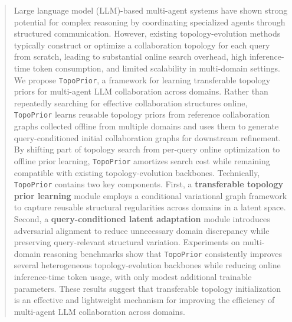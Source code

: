 \documentclass[lettersize,journal]{IEEEtran}
\theoremstyle{plain}
\begin{document}



\maketitle

\begin{abstract}
Large language model (LLM)-based multi-agent systems have shown strong potential for complex reasoning by coordinating specialized agents through structured communication. However, existing topology-evolution methods typically construct or optimize a collaboration topology for each query from scratch, leading to substantial online search overhead, high inference-time token consumption, and limited scalability in multi-domain settings.
We propose \texttt{TopoPrior}, a framework for learning transferable topology priors for multi-agent LLM collaboration across domains. Rather than repeatedly searching for effective collaboration structures online, \texttt{TopoPrior} learns reusable topology priors from reference collaboration graphs collected offline from multiple domains and uses them to generate query-conditioned initial collaboration graphs for downstream refinement. By shifting part of topology search from per-query online optimization to offline prior learning, \texttt{TopoPrior} amortizes search cost while remaining compatible with existing topology-evolution backbones.
Technically, \texttt{TopoPrior} contains two key components. First, a \textbf{transferable topology prior learning} module employs a conditional variational graph framework to capture reusable structural regularities across domains in a latent space. Second, a \textbf{query-conditioned latent adaptation} module introduces adversarial alignment to reduce unnecessary domain discrepancy while preserving query-relevant structural variation.
Experiments on multi-domain reasoning benchmarks show that \texttt{TopoPrior} consistently improves several heterogeneous topology-evolution backbones while reducing online inference-time token usage, with only modest additional trainable parameters. These results suggest that transferable topology initialization is an effective and lightweight mechanism for improving the efficiency of multi-agent LLM collaboration across domains.
\end{abstract}
\end{document}
